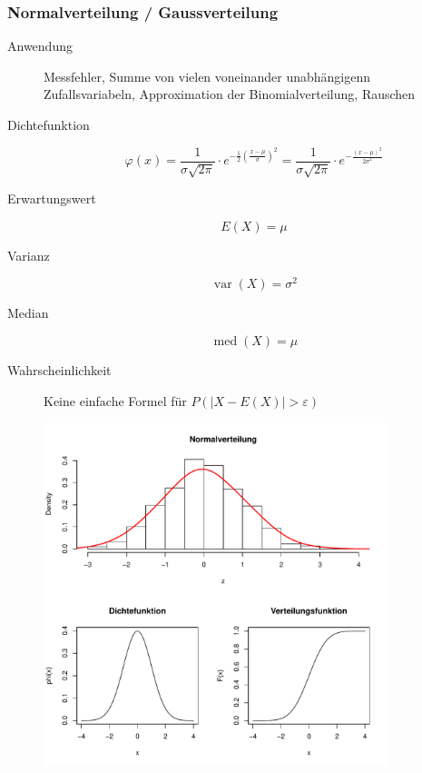 \subsubsection{Normalverteilung / Gaussverteilung}
\begin{description}
  \item[Anwendung] Messfehler, Summe von vielen voneinander
    unabhängigenn Zufallsvariabeln, Approximation der
    Binomialverteilung, Rauschen
  \item[Dichtefunktion] \[\varphi(x) = \frac{1}{\sigma \sqrt{2\pi}} \cdot 
    e^{-\frac{1}{2}{\left(\frac{x-\mu}{\sigma}\right)}^2} =
    \frac{1}{\sigma \sqrt{2\pi}} \cdot e^{-\frac{(x-\mu)^2}{2\sigma^2}}\]
  \item[Erwartungswert] \[E(X) = \mu\]
  \item[Varianz] \[\operatorname{var}(X) = \sigma^2\]
  \item[Median] \[\operatorname{med}(X) = \mu\]
  \item[Wahrscheinlichkeit] Keine einfache Formel für
    $P(|X - E(X)| > \varepsilon)$
\end{description}
\begin{figure}[!htbp]
  \centering
  \includegraphics[width=10cm]{images/normalverteilung.pdf}
\end{figure}



